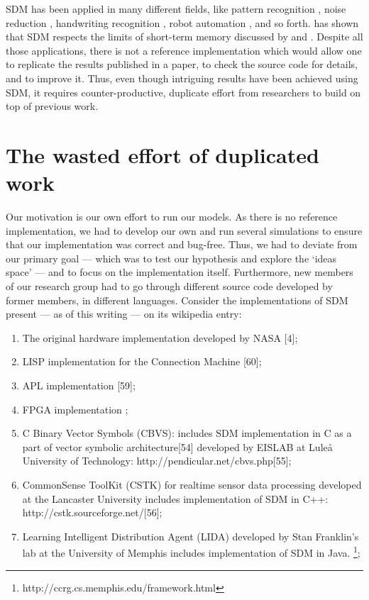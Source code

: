 SDM has been applied in many different fields, like pattern recognition \citep{norman2003modeling, rao1995natural}, noise reduction \citep{Meng2009}, handwriting recognition \citep{fan1997genetic}, robot automation \citep{Rajesh1998, mendes2008robot}, and so forth. \citet{Linhares2011} has shown that SDM respects the limits of short-term memory discussed by \citet{Miller1955} and \citet{Cowan2001}. Despite all those applications, there is not a reference implementation which would allow one to replicate the results published in a paper, to check the source code for details, and to improve it. Thus, even though intriguing results have been achieved using SDM, it requires counter-productive, duplicate effort from researchers to build on top of previous work.

\section{The wasted effort of duplicated work}

Our motivation is our own effort to run our models. As there is no reference implementation, we had to develop our own and run several simulations to ensure that our implementation was correct and bug-free. Thus, we had to deviate from our primary goal --- which was to test our hypothesis and explore the `ideas space' --- and to focus on the implementation itself. Furthermore, new members of our research group had to go through different source code developed by former members, in different languages.  Consider the implementations of SDM present --- as of this writing --- on its wikipedia entry\citep{noauthor_sparse_2018}:

\begin{enumerate}
    \item The original hardware implementation developed by NASA [4];

    \item LISP implementation for the Connection Machine [60];

    \item APL implementation [59];

    \item FPGA implementation \citep{silva_reconfigurable_2004};

    \item C Binary Vector Symbols (CBVS): includes SDM implementation in C as a part of vector symbolic architecture[54] developed by EISLAB at Luleå University of Technology: http://pendicular.net/cbvs.php[55];

    \item CommonSense ToolKit (CSTK) for realtime sensor data processing developed at the Lancaster University includes implementation of SDM in C++: http://cstk.sourceforge.net/[56];

    \item Learning Intelligent Distribution Agent (LIDA) developed by Stan Franklin's lab at the University of Memphis includes implementation of SDM in Java. \footnote{http://ccrg.cs.memphis.edu/framework.html};

\end{enumerate}

